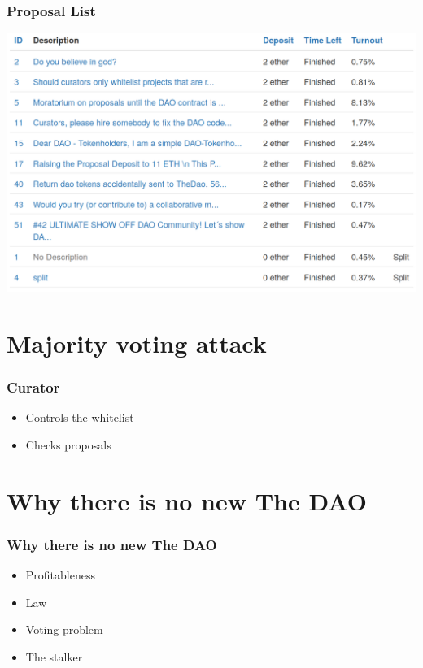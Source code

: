 \documentclass{beamer}
\begin{document}
\begin{frame}
\frametitle{Proposal List}
\includegraphics[width=\textwidth,height=0.8\textheight,keepaspectratio]{assets/proposals.png}
\end{frame}

\section{Majority voting attack}

\begin{frame}
\frametitle{Curator}
\begin{itemize}
  \item Controls the whitelist
  \item Checks proposals
\end{itemize}
\end{frame}

\section{Why there is no new The DAO}

\begin{frame}
\frametitle{Why there is no new The DAO}
\begin{itemize}
	\item Profitableness
	\item Law
	\item Voting problem
	\item The stalker
\end{itemize}
\end{frame}
\end{document}
